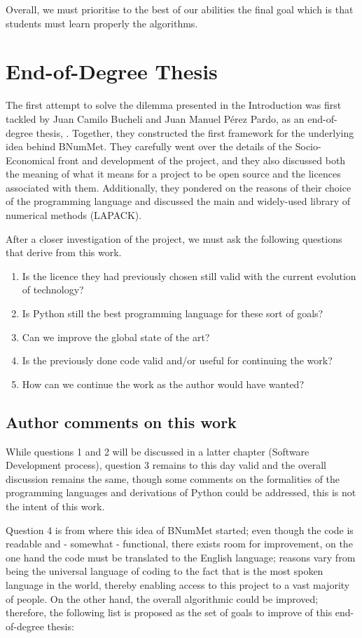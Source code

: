 Overall, we must prioritise to the best of our abilities the final goal which is that students must learn properly the algorithms. 

\section{End-of-Degree Thesis}
The first attempt to solve the dilemma presented in the Introduction was first tackled by Juan Camilo Bucheli and Juan Manuel Pérez Pardo, as an end-of-degree thesis, \cite{}. Together, they constructed the first framework for the underlying idea behind BNumMet.
They carefully went over the details of the Socio-Economical front and development of the project, and they also discussed both the meaning of what it means for a project to be open source and the licences associated with them. Additionally, they pondered on the reasons of their choice of the programming language and discussed the main and widely-used library of numerical methods (LAPACK). 


After a closer investigation of the project, we must ask the following questions that derive from this work.
\begin{enumerate}
    \item Is the licence they had previously chosen still valid with the current evolution of technology?
    \item Is Python still the best programming language for these sort of goals?
    \item Can we improve the global state of the art?
    \item Is the previously done code valid and/or useful for continuing the work?
    \item How can we continue the work as the author would have wanted?
\end{enumerate}


\subsection{Author comments on this work}
While questions 1 and 2 will be discussed in a latter chapter (Software Development process), question 3 remains to this day valid and the overall discussion remains the same, though some comments on the formalities of the programming languages and derivations of Python could be addressed, this is not the intent of this work.

Question 4 is from where this idea of BNumMet started; even though the code is readable and - somewhat - functional, there exists room for improvement, on the one hand the code must be translated to the English language; reasons vary from being the universal language of coding to the fact that is the most spoken language in the world, thereby enabling access to this project to a vast majority of people. On the other hand, the overall algorithmic could be improved; therefore, the following list is proposed as the set of goals to improve of this end-of-degree thesis:

